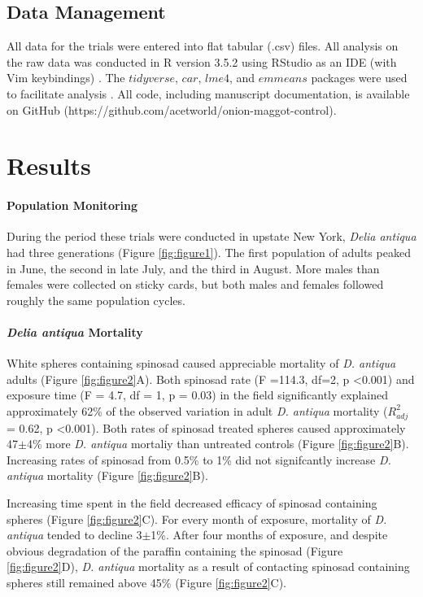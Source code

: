 \documentclass[alpha-refs]{wiley-article}
\begin{document}
\subsection{Data Management}

All data for the trials were entered into flat tabular (.csv) files.  All analysis on the raw data was conducted in R version 3.5.2 using RStudio as an IDE (with Vim keybindings) \citep{rcore2018,rstudio}.  The $tidyverse$, $car$, $lme4$, and $emmeans$ packages were used to facilitate analysis \citep{tidy, car, lme, emmeans}.  All code, including manuscript documentation, is available on GitHub (https://github.com/acetworld/onion-maggot-control).


\section{Results}

\paragraph{Population Monitoring}

During the period these trials were conducted in upstate New York, \textit{Delia antiqua} had three generations (Figure \ref{fig:figure1}).  The first population of adults peaked in June, the second in late July, and the third in August.  More males than females were collected on sticky cards, but both males and females followed roughly the same population cycles. 

\paragraph{\textit{Delia antiqua} Mortality}

White spheres containing spinosad caused appreciable mortality of \textit{D. antiqua} adults (Figure \ref{fig:figure2}A).  Both spinosad rate (F =114.3, df=2, p \textless 0.001)  and exposure time (F = 4.7, df = 1, p = 0.03) in the field significantly explained approximately 62\% of the observed variation in adult \textit{D. antiqua} mortality ($R^2_{adj}$ = 0.62, p \textless 0.001).  Both rates of spinosad treated spheres caused approximately 47$\pm$4\% more \textit{D. antiqua} mortaliy than untreated controls (Figure \ref{fig:figure2}B).  Increasing rates of spinosad from 0.5\% to 1\% did not signifcantly increase \textit{D. antiqua} mortality (Figure \ref{fig:figure2}B).  

Increasing time spent in the field decreased efficacy of spinosad containing spheres (Figure \ref{fig:figure2}C).  For every month of exposure, mortality of \textit{D. antiqua} tended to decline 3$\pm$1\%.  After four months of exposure, and despite obvious degradation of the paraffin containing the spinosad (Figure \ref{fig:figure2}D), \textit{D. antiqua} mortality as a result of contacting spinosad containing spheres still remained above 45\% (Figure \ref{fig:figure2}C).  
\end{document}
